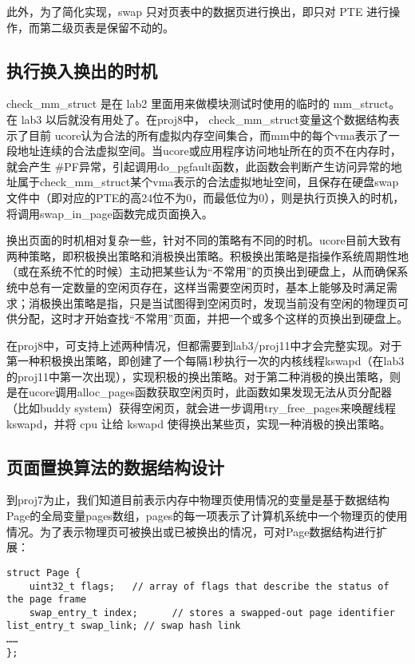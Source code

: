 此外，为了简化实现，swap 只对页表中的数据页进行换出，即只对 PTE
进行操作，而第二级页表是保留不动的。

\subsection{执行换入换出的时机}\label{ux6267ux884cux6362ux5165ux6362ux51faux7684ux65f6ux673a}

check\_mm\_struct 是在 lab2 里面用来做模块测试时使用的临时的
mm\_struct。在 lab3 以后就没有用处了。在proj8中，
check\_mm\_struct变量这个数据结构表示了目前
ucore认为合法的所有虚拟内存空间集合，而mm中的每个vma表示了一段地址连续的合法虚拟空间。当ucore或应用程序访问地址所在的页不在内存时，就会产生
\#PF异常，引起调用do\_pgfault函数，此函数会判断产生访问异常的地址属于check\_mm\_struct某个vma表示的合法虚拟地址空间，且保存在硬盘swap文件中（即对应的PTE的高24位不为0，而最低位为0），则是执行页换入的时机，将调用swap\_in\_page函数完成页面换入。

换出页面的时机相对复杂一些，针对不同的策略有不同的时机。ucore目前大致有两种策略，即积极换出策略和消极换出策略。积极换出策略是指操作系统周期性地（或在系统不忙的时候）主动把某些认为``不常用''的页换出到硬盘上，从而确保系统中总有一定数量的空闲页存在，这样当需要空闲页时，基本上能够及时满足需求；消极换出策略是指，只是当试图得到空闲页时，发现当前没有空闲的物理页可供分配，这时才开始查找``不常用''页面，并把一个或多个这样的页换出到硬盘上。

在proj8中，可支持上述两种情况，但都需要到lab3/proj11中才会完整实现。对于第一种积极换出策略，即创建了一个每隔1秒执行一次的内核线程kswapd（在lab3的proj11中第一次出现），实现积极的换出策略。对于第二种消极的换出策略，则是在ucore调用alloc\_pages函数获取空闲页时，此函数如果发现无法从页分配器（比如buddy
system）获得空闲页，就会进一步调用try\_free\_pages来唤醒线程kswapd，并将
cpu 让给 kswapd 使得换出某些页，实现一种消极的换出策略。

\subsection{页面置换算法的数据结构设计}\label{ux9875ux9762ux7f6eux6362ux7b97ux6cd5ux7684ux6570ux636eux7ed3ux6784ux8bbeux8ba1}

到proj7为止，我们知道目前表示内存中物理页使用情况的变量是基于数据结构Page的全局变量pages数组，pages的每一项表示了计算机系统中一个物理页的使用情况。为了表示物理页可被换出或已被换出的情况，可对Page数据结构进行扩展：

\begin{lstlisting}
struct Page {
    uint32_t flags;   // array of flags that describe the status of the page frame
    swap_entry_t index;      // stores a swapped-out page identifier
list_entry_t swap_link; // swap hash link
……
};
\end{lstlisting}

